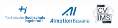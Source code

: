 

\begin{titlepage}	
		\begin{figure}[!h]
			\centering
			\includegraphics[width={0.2\textwidth}]{images/thiRGB.jpg}	
			\hfill
			\includegraphics[width={0.2\textwidth}]{images/ai-motion.png}	
			\hfill
			\includegraphics[width={0.1\textwidth}]{images/cvims.png}	
		\end{figure}																			
	
	\begin{center}
		\hrulefill 
	\end{center}
	

\end{titlepage}
